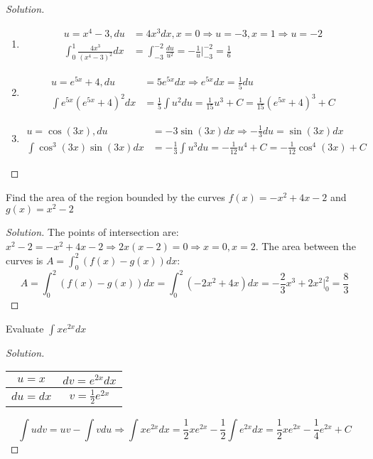 \documentclass[crop=false,class=book,oneside]{standalone}
\begin{document}
\begin{proof}[Solution]
\
\begin{enumerate}
    \item   \begin{align*}
    u=x^{4}-3,du&=4x^{3}dx,x=0\Rightarrow u=-3,x=1\Rightarrow u=-2\\
    \int_{0}^{1}\frac{4x^{3}}{(x^{4}-3)^{2}}dx&=\int_{-3}^{-2}\frac{du}{u^{2}}=-\frac{1}{u}\big|_{-3}^{-2}=\frac{1}{6}
            \end{align*}
    \item   \begin{align*}
    u=e^{5x}+4,du&=5e^{5x}dx\Rightarrow e^{5x}dx=\frac{1}{5}du\\
    \int e^{5x}(e^{5x}+4)^{2}dx&=\frac{1}{5}\int u^{2}du=\frac{1}{15}u^{3}+C=\frac{1}{15}(e^{5x}+4)^{3}+C
            \end{align*}
    \item   \begin{align*}
    u=\cos(3x),du&=-3\sin(3x)dx\Rightarrow -\frac{1}{3}du=\sin(3x)dx\\
    \int \cos^{3}(3x)\sin(3x)dx&=-\frac{1}{3}\int u^{3}du=-\frac{1}{12}u^{4}+C=-\frac{1}{12}\cos^{4}(3x)+C
            \end{align*}
\end{enumerate}
\end{proof}
\begin{problem}
Find the area of the region bounded by the curves $f(x)=-x^{2}+4x-2$ and $g(x)=x^{2}-2$
\end{problem}
\begin{proof}[Solution]
The points of intersection are: $x^{2}-2=-x^{2}+4x-2\Rightarrow 2x(x-2)=0\Rightarrow x=0,x=2$.
The area between the curves is $A=\int_{0}^{2}(f(x)-g(x))dx$:
\begin{equation*}
    A=\int_{0}^{2}(f(x)-g(x))dx=\int_{0}^{2}(-2x^{2}+4x)dx=-\frac{2}{3}x^{3}+2x^{2}\big|_{0}^{2}=\frac{8}{3}
\end{equation*}
\end{proof}
\begin{problem}
Evaluate $\int xe^{2x}dx$
\end{problem}
\begin{proof}[Solution]
\
\begin{table}[H]
    \centering
    \begin{tabular}{|c|c|}
        \hline
        $u=x$&$dv=e^{2x}dx$\\
        \hline
        $du=dx$&$v=\frac{1}{2}e^{2x}$\\
        \hline
    \end{tabular}
\end{table}
\begin{equation*}
    \int udv=uv-\int vdu\Rightarrow \int xe^{2x}dx=\frac{1}{2}xe^{2x}-\frac{1}{2}\int e^{2x}dx=\frac{1}{2}xe^{2x}-\frac{1}{4}e^{2x}+C
\end{equation*}
\end{proof}
\end{document}
